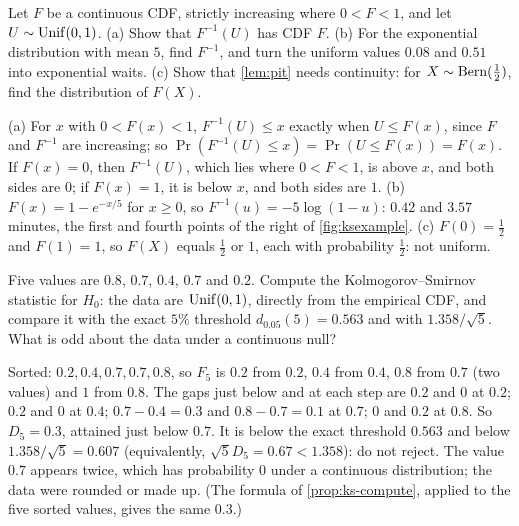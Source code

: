 \begin{exercise}
\label{ex:ks-pit}
Let $F$ be a continuous CDF, strictly increasing where $0 < F < 1$, and let $U \sim \mathrm{Unif}(0, 1)$. (a) Show that $F^{-1}(U)$ has CDF $F$. (b) For the exponential distribution with mean $5$, find $F^{-1}$, and turn the uniform values $0.08$ and $0.51$ into exponential waits. (c) Show that \cref{lem:pit} needs continuity: for $X \sim \text{Bern}(\frac12)$, find the distribution of $F(X)$.
\end{exercise}
\begin{solution}
(a) For $x$ with $0 < F(x) < 1$, $F^{-1}(U) \leq x$ exactly when $U \leq F(x)$, since $F$ and $F^{-1}$ are increasing; so $\Pr(F^{-1}(U) \leq x) = \Pr(U \leq F(x)) = F(x)$. If $F(x) = 0$, then $F^{-1}(U)$, which lies where $0 < F < 1$, is above $x$, and both sides are $0$; if $F(x) = 1$, it is below $x$, and both sides are $1$. (b) $F(x) = 1 - e^{-x/5}$ for $x \geq 0$, so $F^{-1}(u) = -5\log(1 - u)$: $0.42$ and $3.57$ minutes, the first and fourth points of the right of \cref{fig:ksexample}. (c) $F(0) = \frac12$ and $F(1) = 1$, so $F(X)$ equals $\frac12$ or $1$, each with probability $\frac12$: not uniform.
\end{solution}

\begin{exercise}
\label{ex:ks-hand}
Five values are $0.8$, $0.7$, $0.4$, $0.7$ and $0.2$. Compute the Kolmogorov--Smirnov statistic for $H_0$: the data are $\mathrm{Unif}(0, 1)$, directly from the empirical CDF, and compare it with the exact $5\%$ threshold $d_{0.05}(5) = 0.563$ and with $1.358/\sqrt{5}$. What is odd about the data under a continuous null?
\end{exercise}
\begin{solution}
Sorted: $0.2, 0.4, 0.7, 0.7, 0.8$, so $F_5$ is $0.2$ from $0.2$, $0.4$ from $0.4$, $0.8$ from $0.7$ (two values) and $1$ from $0.8$. The gaps just below and at each step are $0.2$ and $0$ at $0.2$; $0.2$ and $0$ at $0.4$; $0.7 - 0.4 = 0.3$ and $0.8 - 0.7 = 0.1$ at $0.7$; $0$ and $0.2$ at $0.8$. So $D_5 = 0.3$, attained just below $0.7$. It is below the exact threshold $0.563$ and below $1.358/\sqrt{5} = 0.607$ (equivalently, $\sqrt{5}D_5 = 0.67 < 1.358$): do not reject. The value $0.7$ appears twice, which has probability $0$ under a continuous distribution; the data were rounded or made up. (The formula of \cref{prop:ks-compute}, applied to the five sorted values, gives the same $0.3$.)
\end{solution}

